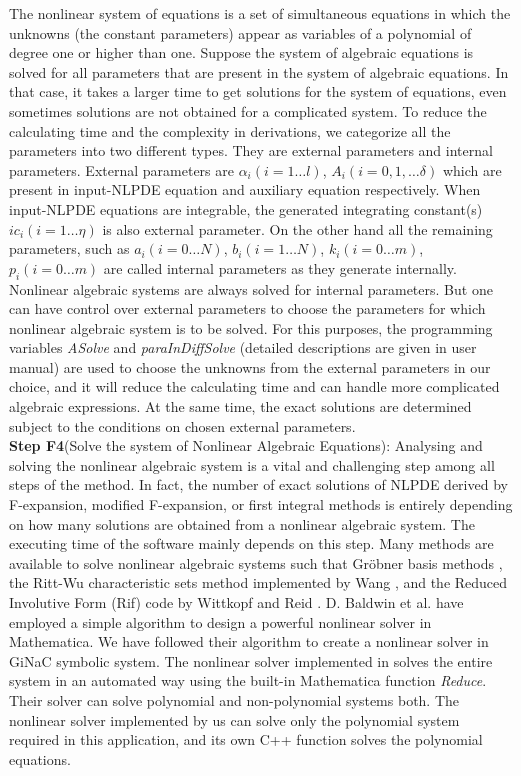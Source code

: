 \documentclass[prd,aps,floats,showkeys,nofootinbib,notitlepage]{revtex4-2}
\begin{document}
	The nonlinear system of equations is a set of simultaneous equations in which the unknowns (the constant parameters) appear as variables of a polynomial of degree one or higher than one.
	Suppose the system of algebraic equations is solved for all parameters that are present in the system of algebraic equations. In that case, it takes a larger time to get solutions for the system of equations, even sometimes solutions are not obtained for a complicated system. To reduce the calculating time and the complexity in derivations, we categorize all the parameters into two different types. They are external parameters and internal parameters. External parameters are $\alpha_i(i=1\ldots l)$, $A_i(i=0,1,\ldots \delta)$ which are present in input-NLPDE equation and auxiliary equation respectively. When input-NLPDE equations are integrable, the generated integrating constant(s) $ic_i(i=1\ldots \eta)$ is also external parameter. On the other hand all the remaining parameters, such as $a_i(i=0\ldots N)$, $b_i(i=1\ldots N)$, $k_i(i=0\ldots m)$, $p_i(i=0\ldots m)$ are called internal parameters as they generate internally. Nonlinear algebraic systems are always solved for internal parameters. But one can have control over external parameters to choose the parameters for which nonlinear algebraic system is to be solved. For this purposes, the programming variables {\em ASolve} and {\em paraInDiffSolve} (detailed descriptions are given in user manual) are used to choose the unknowns from the external parameters in our choice, and it will reduce the calculating time and can handle more complicated algebraic expressions. At the same time, the exact solutions are determined subject to the conditions on chosen external parameters.    \\
	
	\textbf{Step F4}(Solve the system of Nonlinear Algebraic Equations): Analysing and solving the nonlinear algebraic system is a vital and challenging step among all steps of the method. In fact, the number of exact solutions of NLPDE derived by F-expansion, modified F-expansion, or first integral methods is entirely depending on how many solutions are obtained from a nonlinear algebraic system. The executing time of the software mainly depends on this step. Many methods are available to solve nonlinear algebraic systems such that Gröbner basis methods \cite{grobner}, the Ritt-Wu characteristic sets method implemented by Wang \cite{RittWu,RittWu1}, and the Reduced Involutive Form (Rif) code by Wittkopf and Reid \cite{rif}. D. Baldwin et al. \cite{baldwin} have employed a simple algorithm to design a powerful nonlinear solver in Mathematica. We have followed their algorithm to create a nonlinear solver in GiNaC symbolic system. The nonlinear solver implemented in \cite{baldwin} solves the entire system in an automated way using the built-in Mathematica function \textit{Reduce}. Their solver can solve polynomial and non-polynomial systems both. The nonlinear solver implemented by us can solve only the polynomial system required in this application, and its own C++ function solves the polynomial equations.  
	
\end{document}
